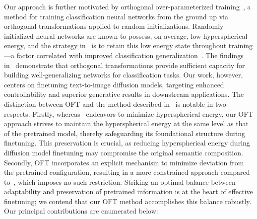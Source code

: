 Our approach is further motivated by orthogonal over-parameterized training~\cite{liu2021orthogonal}, a method for training classification neural networks from the ground up via orthogonal transformations applied to random initializations. Randomly initialized neural networks are known to possess, on average, low hyperspherical energy, and the strategy in~\cite{liu2021orthogonal} is to retain this low energy state throughout training—a factor correlated with improved classification generalization~\cite{liu2018learning,lin2020regularizing}. The findings in~\cite{liu2021orthogonal} demonstrate that orthogonal transformations provide sufficient capacity for building well-generalizing networks for classification tasks. Our work, however, centers on finetuning text-to-image diffusion models, targeting enhanced controllability and superior generative results in downstream applications. The distinction between OFT and the method described in~\cite{liu2021orthogonal} is notable in two respects. Firstly, whereas~\cite{liu2021orthogonal} endeavors to minimize hyperspherical energy, our OFT approach strives to maintain the hyperspherical energy at the same level as that of the pretrained model, thereby safeguarding its foundational structure during finetuning. This preservation is crucial, as reducing hyperspherical energy during diffusion model finetuning may compromise the original semantic composition. Secondly, OFT incorporates an explicit mechanism to minimize deviation from the pretrained configuration, resulting in a more constrained approach compared to~\cite{liu2021orthogonal}, which imposes no such restriction. Striking an optimal balance between adaptability and preservation of pretrained information is at the heart of effective finetuning; we contend that our OFT method accomplishes this balance robustly. Our principal contributions are enumerated below:

